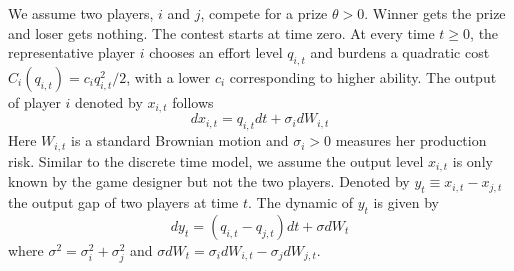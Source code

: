 \documentclass[a4paper, 11pt]{article}
\theoremstyle{plain} %
\begin{document}
We assume two players, $i$ and $j$, compete for a prize $\theta>0$. 
Winner gets the prize and loser gets nothing. 
The contest starts at time zero. 
At every time $t\ge0$, the representative player $i$ chooses an effort level $q_{i,t}$ and burdens a quadratic cost $C_i(q_{i,t}) = c_i q_{i,t}^2/2$, with a lower $c_i$ corresponding to higher ability. 
The output of player $i$ denoted by $x_{i,t}$ follows 
\begin{equation}\label{output-process}
dx_{i,t} = q_{i,t} dt + \sigma_idW_{i,t} 
\end{equation}
Here $W_{i,t}$ is a standard Brownian motion and $\sigma_i>0$ measures her production risk. 
Similar to the discrete time model, we assume the output level $x_{i,t}$ is only known by the game designer but not the two players. 
Denoted by $y_t \equiv x_{i,t} - x_{j,t}$ the output gap of two players at time $t$.
The dynamic of $y_t$ is given by 
\begin{equation}
	dy_t = (q_{i,t}-q_{j,t})dt + \sigma dW_t
\end{equation}
where $\sigma^2 = \sigma^2_i + \sigma_j^2$ and $\sigma dW_t = \sigma_idW_{i,t}-\sigma_jdW_{j,t}$. 
\end{document}
